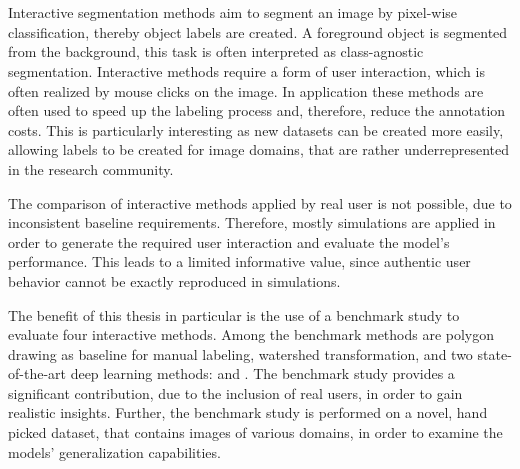 \chapter{\abstractname}



Interactive segmentation methods aim to segment an image by pixel-wise classification, thereby object labels are created.
A foreground object is segmented from the background, this task is often interpreted as class-agnostic segmentation.
Interactive methods require a form of user interaction, which is often realized by mouse clicks on the image. 
In application these methods are often used to speed up the labeling process and, therefore, reduce the annotation costs.
This is particularly interesting as new datasets can be created more easily, allowing labels to be created for image domains, that are rather underrepresented in the research community.

The comparison of interactive methods applied by real user is not possible, due to inconsistent baseline requirements.
Therefore, mostly simulations are applied in order to generate the required user interaction and evaluate the model's performance.
This leads to a limited informative value, since authentic user behavior cannot be exactly reproduced in simulations.

The benefit of this thesis in particular is the use of a benchmark study to evaluate four interactive methods.
Among the benchmark methods are polygon drawing as baseline for manual labeling, watershed transformation, and two state-of-the-art deep learning methods:  and .
The benchmark study provides a significant contribution, due to the inclusion of real users, in order to gain realistic insights.
Further, the benchmark study is performed on a novel, hand picked dataset, that contains images of various domains, in order to examine the models' generalization capabilities.

